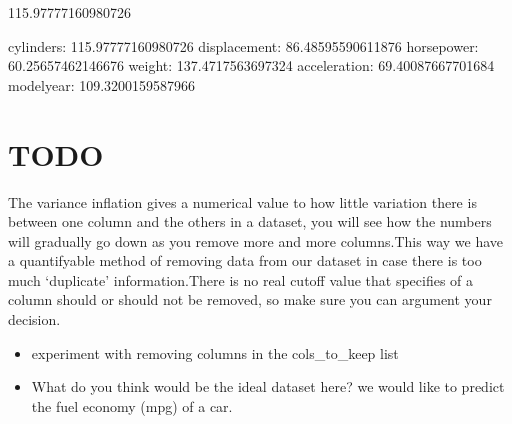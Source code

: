 \documentclass[letterpaper,10pt,english]{jupyterBook}
\begin{document}
\begin{sphinxVerbatim}[commandchars=\\\{\}]
115.97777160980726
\end{sphinxVerbatim}

\begin{sphinxVerbatim}[commandchars=\\\{\}]
    
       
\end{sphinxVerbatim}

\begin{sphinxVerbatim}[commandchars=\\\{\}]
cylinders: 	115.97777160980726
displacement: 	86.48595590611876
horsepower: 	60.25657462146676
weight: 	137.4717563697324
acceleration: 	69.40087667701684
model\PYGZus{}year: 	109.3200159587966
\end{sphinxVerbatim}


\section{TODO}
\label{\detokenize{c5_data_exploration/variance_inflation:todo}}
\sphinxAtStartPar
The variance inflation gives a numerical value to how little variation there is between one column and the others in a dataset, you will see how the numbers will gradually go down as you remove more and more columns.This way we have a quantifyable method of removing data from our dataset in case there is too much ‘duplicate’ information.There is no real cut\sphinxhyphen{}off value that specifies of a column should or should not be removed, so make sure you can argument your decision.
\begin{itemize}
\item {} 
\sphinxAtStartPar
experiment with removing columns in the cols\_to\_keep list

\item {} 
\sphinxAtStartPar
What do you think would be the ideal dataset here? we would like to predict the fuel economy (mpg) of a car.

\end{itemize}
\end{document}

